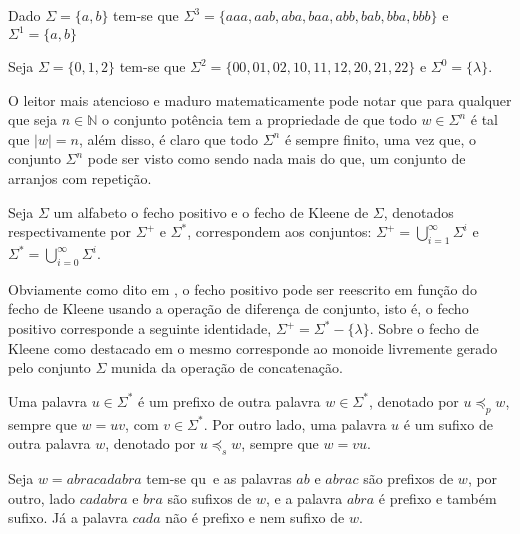 \begin{exemplo}
	Dado $\Sigma = \{a, b\}$ tem-se que $\Sigma^3 = \{aaa, aab, aba, baa, abb, bab, bba, bbb\}$ e $\Sigma^1 = \{a, b\}$
\end{exemplo}

\begin{exemplo}
	Seja $\Sigma = \{0, 1, 2\}$ tem-se que $\Sigma^2 = \{00, 01, 02, 10, 11, 12, 20, 21, 22\}$ e $\Sigma^{0} = \{\lambda\}$.
\end{exemplo}

O leitor mais atencioso e maduro matematicamente pode notar que para qualquer que seja $n \in \mathbb{N}$ o conjunto potência tem a propriedade de que todo $w \in \Sigma^n$ é tal que $|w| = n$, além disso, é claro que todo $\Sigma^n$ é sempre finito, uma vez que, o conjunto $\Sigma^n$ pode ser visto como sendo nada mais do que, um conjunto de arranjos com repetição.

\begin{definicao}\label{def:FechoPositivoKleene}
	Seja $\Sigma$ um alfabeto o fecho positivo e o fecho de Kleene de $\Sigma$, denotados respectivamente por $\Sigma^+$ e $\Sigma^*$, correspondem aos conjuntos: $\displaystyle\Sigma^+  =  \bigcup_{i = 1}^\infty \Sigma^i$ e $\displaystyle \Sigma^*  =  \bigcup_{i = 0}^\infty \Sigma^i$.
\end{definicao}

Obviamente como dito em \cite{benjaLivro2010}, o fecho positivo pode ser reescrito em função do fecho de Kleene usando a operação de diferença de conjunto, isto é, o fecho positivo corresponde a seguinte identidade, $\Sigma^+ = \Sigma^* - \{\lambda\}$. Sobre o fecho de Kleene como destacado em \cite{valdi2020phd} o mesmo corresponde ao monoide livremente gerado pelo conjunto $\Sigma$ munida da operação de concatenação.

\begin{definicao}\label{def:PrefixoSufixo}
	Uma palavra $u \in \Sigma^*$ é um prefixo de outra palavra $w \in \Sigma^*$, denotado por $u \preceq_p w$, sempre que $w = uv$, com $v \in \Sigma^*$. Por outro lado, uma palavra $u$ é um sufixo de outra palavra $w$, denotado por $u \preceq_s w$, sempre que $w = vu$.
\end{definicao}

\begin{exemplo}
	Seja $w = abracadabra$ tem-se qu~e as palavras $ab$ e $abrac$ são prefixos de $w$, por outro, lado $cadabra$ e $bra$ são sufixos de $w$, e a palavra $abra$ é prefixo e também sufixo. Já a palavra $cada$ não é prefixo e nem sufixo de $w$.
\end{exemplo}

